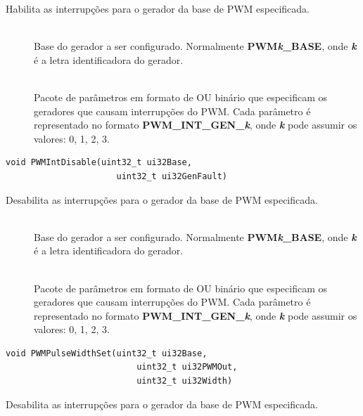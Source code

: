 Habilita as interrupções para o gerador da base de PWM especificada.

\begin{description}
	\item []\hfill \\
	Base do gerador a ser configurado. Normalmente \textbf{PWM\emph{k}\_BASE}, onde \textbf{\emph{k}} é a letra identificadora do gerador.
	
	\item []\hfill \\
	Pacote de parâmetros em formato de OU binário que especificam os geradores que causam interrupções do PWM. Cada parâmetro é representado no formato \textbf{PWM\_INT\_GEN\_\emph{k}}, onde \textbf{\emph{k}} pode assumir os valores: 0, 1, 2, 3.
\end{description}

\begin{lstlisting}[style=funcao]
	void PWMIntDisable(uint32_t ui32Base,
					  uint32_t ui32GenFault)
\end{lstlisting}

Desabilita as interrupções para o gerador da base de PWM especificada.

\begin{description}
	\item []\hfill \\
	Base do gerador a ser configurado. Normalmente \textbf{PWM\emph{k}\_BASE}, onde \textbf{\emph{k}} é a letra identificadora do gerador.
	
	\item []\hfill \\
	Pacote de parâmetros em formato de OU binário que especificam os geradores que causam interrupções do PWM. Cada parâmetro é representado no formato \textbf{PWM\_INT\_GEN\_\emph{k}}, onde \textbf{\emph{k}} pode assumir os valores: 0, 1, 2, 3.
\end{description}

\begin{lstlisting}[style=funcao]
	void PWMPulseWidthSet(uint32_t ui32Base,
						  uint32_t ui32PWMOut,
						  uint32_t ui32Width)
\end{lstlisting}

Desabilita as interrupções para o gerador da base de PWM especificada.

